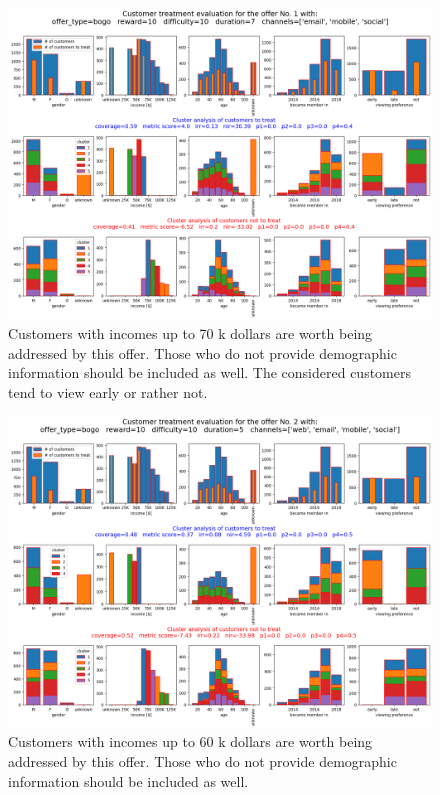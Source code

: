 \documentclass[11pt]{article} %
\begin{document}
\begin{figure}[H]
\includegraphics[height=0.5\textheight]{results/results1.png}
\caption{Customers with  incomes up to 70 k dollars are worth being addressed by this offer. Those who do not provide demographic information should be included as well. The considered customers tend to view early or rather not. }
\end{figure}
\begin{figure}[H]
\includegraphics[height=0.5\textheight]{results/results2.png}
\caption{Customers with  incomes up to 60 k dollars are worth being addressed by this offer. Those who do not provide demographic information should be included as well.}
\end{figure}
\end{document}
